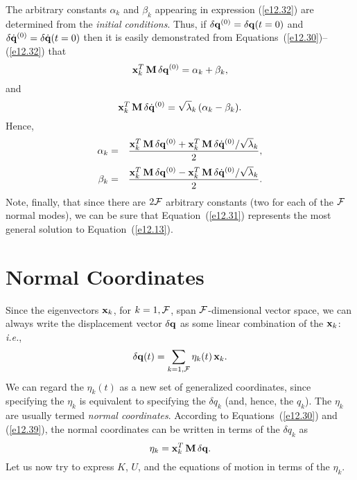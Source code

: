 The arbitrary constants $\alpha_k$ and $\beta_k$ appearing in expression (\ref{e12.32})
are determined from the {\em initial conditions}. Thus, if $\delta {\bf q}^{(0)}
= \delta {\bf q}(t=0)$ and $\delta \dot{\bf q}^{(0)} = \delta \dot{\bf q}(t=0)$
then  it is easily demonstrated from Equations~(\ref{e12.30})--(\ref{e12.32})
that
\begin{equation}
{\bf x}_k^{T}\,{\bf M}\,\delta {\bf q}^{(0)} = \alpha_k + \beta_k,
\end{equation}
and
\begin{equation}
{\bf x}_k^{T}\,{\bf M}\,\delta \dot{\bf q}^{(0)} =\sqrt{\lambda}_k\,(\alpha_k - \beta_k).
\end{equation}
Hence,
\begin{eqnarray}
\alpha_k &=& \frac{{\bf x}_k^{T}\,{\bf M}\,\delta{\bf q}^{(0)} +{\bf x}_k^{T}\,{\bf M}\,\delta \dot{\bf q}^{(0)}/\sqrt{\lambda}_k}{2},\\[0.5ex]
\beta_k &=& \frac{{\bf x}_k^{T}\,{\bf M}\,\delta {\bf q}^{(0)} -{\bf x}_k^{T}\,{\bf M}\,\delta \dot{\bf q}^{(0)}/\sqrt{\lambda}_k}{2}.
\end{eqnarray}
Note, finally, that since there are $2{\cal F}$ arbitrary constants (two for each of the ${\cal F}$ normal modes), we can be sure that Equation~(\ref{e12.31}) represents the
most general solution to Equation~(\ref{e12.13}).

\section{Normal Coordinates}
Since the eigenvectors ${\bf x}_k$, for $k=1,{\cal F}$, span ${\cal F}$-dimensional
vector space, we can always write the displacement vector $\delta{\bf q}$
as some linear combination of the ${\bf x}_k$: {\em i.e.}, 
\begin{equation}\label{e12.39}
\delta {\bf q}(t) = \sum_{k=1,{\cal F}}\eta_k(t)\,{\bf x}_k.
\end{equation}
We can regard the $\eta_k(t)$ as a new set of generalized coordinates,
since specifying the $\eta_k$ is equivalent to specifying the $\delta q_k$
(and, hence, the $q_k$). The $\eta_k$ are usually termed {\em normal coordinates}. According to Equations~(\ref{e12.30}) and (\ref{e12.39}), the
normal coordinates can be written in terms of the $\delta q_k$ as
\begin{equation}\label{e12.40}
\eta_k = {\bf x}_k^T\,{\bf M}\,\delta{\bf q}.
\end{equation}
Let us now try to express $K$, $U$, and the equations of motion
in terms of the $\eta_k$. 

